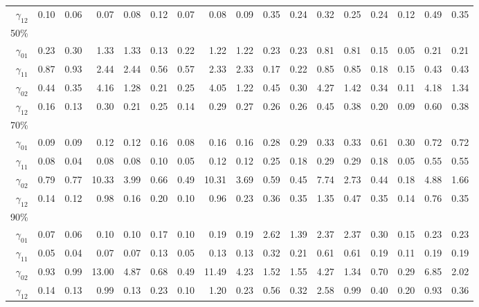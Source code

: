 \documentclass[useAMS,usenatbib,referee]{biom}
\begin{document}
\begin{table}
\begin{tabular}{rrrrrrrrrrrrrrrrr}
$\gamma_{12}$ & 0.10 & 0.06 & 0.07 & 0.08 & 0.12 & 0.07 & 0.08 & 0.09 & 0.35 & 0.24 & 0.32 & 0.25 & 0.24 & 0.12 & 0.49 & 0.35 \\
50\% \\
$\gamma_{01}$ & 0.23 & 0.30 & 1.33 & 1.33 & 0.13 & 0.22 & 1.22 & 1.22 & 0.23 & 0.23 & 0.81 & 0.81 & 0.15 & 0.05 & 0.21 & 0.21 \\
$\gamma_{11}$  & 0.87 & 0.93 & 2.44 & 2.44 & 0.56 & 0.57 & 2.33 & 2.33 & 0.17 & 0.22 & 0.85 & 0.85 & 0.18 & 0.15 & 0.43 & 0.43 \\
$\gamma_{02}$  & 0.44 & 0.35 & 4.16 & 1.28 & 0.21 & 0.25 & 4.05 & 1.22 & 0.45 & 0.30 & 4.27 & 1.42 & 0.34 & 0.11 & 4.18 & 1.34 \\
$\gamma_{12}$  & 0.16 & 0.13 & 0.30 & 0.21 & 0.25 & 0.14 & 0.29 & 0.27 & 0.26 & 0.26 & 0.45 & 0.38 & 0.20 & 0.09 & 0.60 & 0.38 \\
70\% \\
$\gamma_{01}$  & 0.09 & 0.09 & 0.12 & 0.12 & 0.16 & 0.08 & 0.16 & 0.16 & 0.28 & 0.29 & 0.33 & 0.33 & 0.61 & 0.30 & 0.72 & 0.72 \\
$\gamma_{11}$  & 0.08 & 0.04 & 0.08 & 0.08 & 0.10 & 0.05 & 0.12 & 0.12 & 0.25 & 0.18 & 0.29 & 0.29 & 0.18 & 0.05 & 0.55 & 0.55 \\
$\gamma_{02}$  & 0.79 & 0.77 & 10.33 & 3.99 & 0.66 & 0.49 & 10.31 & 3.69 & 0.59 & 0.45 & 7.74 & 2.73 & 0.44 & 0.18 & 4.88 & 1.66 \\
$\gamma_{12}$  & 0.14 & 0.12 & 0.98 & 0.16 & 0.20 & 0.10 & 0.96 & 0.23 & 0.36 & 0.35 & 1.35 & 0.47 & 0.35 & 0.14 & 0.76 & 0.35 \\
90\% \\
$\gamma_{01}$  & 0.07 & 0.06 & 0.10 & 0.10 & 0.17 & 0.10 & 0.19 & 0.19 & 2.62 & 1.39 & 2.37 & 2.37 & 0.30 & 0.15 & 0.23 & 0.23 \\
$\gamma_{11}$  & 0.05 & 0.04 & 0.07 & 0.07 & 0.13 & 0.05 & 0.13 & 0.13 & 0.32 & 0.21 & 0.61 & 0.61 & 0.19 & 0.11 & 0.19 & 0.19 \\
$\gamma_{02}$  & 0.93 & 0.99 & 13.00 & 4.87 & 0.68 & 0.49 & 11.49 & 4.23 & 1.52 & 1.55 & 4.27 & 1.34 & 0.70 & 0.29 & 6.85 & 2.02 \\
$\gamma_{12}$  & 0.14 & 0.13 & 0.99 & 0.13 & 0.23 & 0.10 & 1.20 & 0.23 & 0.56 & 0.32 & 2.58 & 0.99 & 0.40 & 0.20 & 0.93 & 0.36 \\
\hline
  \end{tabular}

\end{table}
\end{document}
